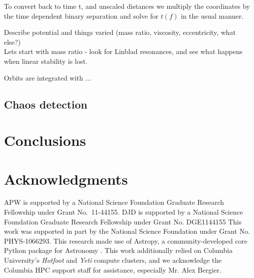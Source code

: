 \documentclass[usenatbib]{mn2e}
\begin{document}

To convert back to time t, and unscaled distances we multiply the
coordinates by the time dependent binary separation and solve for
$t(f)$ in the usual manner.



Describe potential and things varied (mass ratio, viscosity,
eccentricity, what else?)\\ Lets start with mass ratio - look for
Linblad resonances, and see what happens when linear stability is
lost.

Orbits are integrated with ...

\subsection{Chaos detection}\label{sec:chaos}

\section{Conclusions}\label{sec:conclusions}

\section{Acknowledgments}
APW is supported by a National Science Foundation Graduate Research Fellowship under Grant No.\ 11-44155. DJD is supported by a National Science Foundation Graduate Research Fellowship under Grant No. DGE1144155
This work was supported in part by the National Science Foundation under Grant No. PHYS-1066293.
This research made use of Astropy, a community-developed core Python package for Astronomy \citep{astropy13}.
This work additionally relied on Columbia University's \emph{Hotfoot} and \emph{Yeti} compute clusters, and we acknowledge the Columbia HPC support staff for assistance, especially Mr. Alex Bergier. 

%
%
\end{document}
